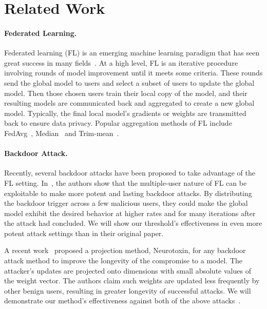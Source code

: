 \documentclass{article} %
\begin{document}
%
\section{Related Work}

\paragraph{Federated Learning.} Federated learning (FL) is an emerging machine learning paradigm that has seen great success in many fields~\cite{ryffel2018generic,hard2018federated,bonawitz2019towards}. At a high level, FL is an iterative procedure involving rounds of model improvement until it meets some criteria. These rounds send the global model to users and select a subset of users to update the global model. Then those chosen users train their local copy of the model, and their resulting models are communicated back and aggregated to create a new global model. Typically, the final local model's gradients or weights are transmitted back to ensure data privacy. Popular aggregation methods of FL include FedAvg~\cite{fedavg}, Median~\cite{yin2018byzantine} and Trim-mean~\cite{yin2018byzantine}.

\paragraph{Backdoor Attack.} Recently, several backdoor attacks have been proposed to take advantage of the FL setting. In~\cite{dba}, the authors show that the multiple-user nature of FL can be exploitable to make more potent and lasting backdoor attacks. By distributing the backdoor trigger across a few malicious users, they could make the global model exhibit the desired behavior at higher rates and for many iterations after the attack had concluded. We will show our threshold's effectiveness in even more potent attack settings than in their original paper. 

A recent work~\cite{neurotoxin} proposed a projection method, Neurotoxin, for any backdoor attack method to improve the longevity of the compromise to a model. The attacker's updates are projected onto dimensions with small absolute values of the weight vector. The authors claim such weights are updated less frequently by other benign users, resulting in greater longevity of successful attacks. We will demonstrate our method's effectiveness against both of the above attacks~\cite{dba, neurotoxin}.
\end{document}
